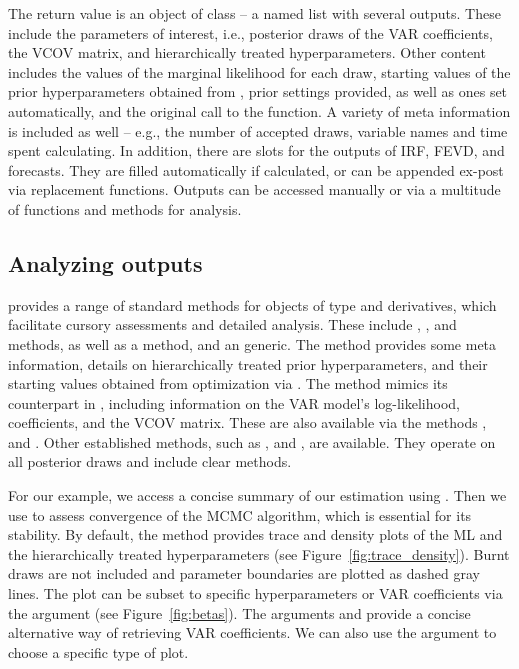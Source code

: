 \documentclass[article,nojss]{jss} %
\begin{document}
The return value is an object of class  -- a named list with several outputs. These include the parameters of interest, i.e., posterior draws of the VAR coefficients, the VCOV matrix, and hierarchically treated hyperparameters.
Other content includes the values of the marginal likelihood for each draw, starting values of the prior hyperparameters obtained from , prior settings provided, as well as ones set automatically, and the original call to the  function.
A variety of meta information is included as well -- e.g., the number of accepted draws, variable names and time spent calculating.
In addition, there are slots for the outputs of IRF, FEVD, and forecasts. They are filled automatically if calculated, or can be appended ex-post via replacement functions.
Outputs can be accessed manually or via a multitude of functions and methods for analysis.

\subsection{Analyzing outputs}\label{subsec:assess}

 provides a range of standard methods for objects of type  and derivatives, which facilitate cursory assessments and detailed analysis. These include , , and  methods, as well as a  method, and an  generic.
The  method provides some meta information, details on hierarchically treated prior hyperparameters, and their starting values obtained from optimization via . The  method mimics its counterpart in , including information on the VAR model's log-likelihood, coefficients, and the VCOV matrix. These are also available via the methods ,  and .
Other established methods, such as ,  and , are available. They operate on all posterior draws and include clear  methods.

For our example, we access a concise summary of our estimation using . Then we use  to assess convergence of the MCMC algorithm, which is essential for its stability. By default, the method provides trace and density plots of the ML and the hierarchically treated hyperparameters (see Figure~\ref{fig:trace_density}). Burnt draws are not included and parameter boundaries are plotted as dashed gray lines.
The plot can be subset to specific hyperparameters or VAR coefficients via the  argument (see Figure~\ref{fig:betas}). The arguments  and  provide a concise alternative way of retrieving VAR coefficients. We can also use the  argument to choose a specific type of plot.
\end{document}
